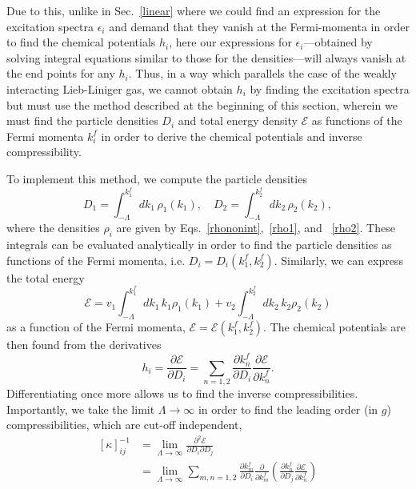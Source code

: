 \documentclass[aps,pra,
superscriptaddress,
reprint,twocolumn,preprintnumbers,
amsmath,amssymb,
nofootinbib]{revtex4-1}
\newcommand{\beq}{\begin{equation}}
\newcommand{\eeq}{\end{equation}}
\begin{document}
Due to this, unlike in Sec.~\ref{linear} where we could find an expression for the excitation spectra $\epsilon_i$ and demand that they vanish at the Fermi-momenta in order to find the chemical potentials $h_i$, here our expressions for $\epsilon_i$---obtained by solving integral equations similar to those for the densities---will always vanish at the end points for any $h_i$. Thus, in a way which parallels the case of the weakly interacting Lieb-Liniger gas, we cannot obtain $h_i$ by finding the excitation spectra but must use the method described at the beginning of this section, wherein we must find the particle densities $D_i$ and total energy density $\mathcal{E}$ as functions of the Fermi momenta $k_i^f$ in order to derive the chemical potentials and inverse compressibility. 


To implement this method, we compute  the particle densities 
\beq
\label{dens}
D_1 = \int_{-\Lambda}^{k_1^f} dk_1\, \rho_1(k_1),\quad D_2 = \int_{-\Lambda}^{k_2^f} dk_2\, \rho_2(k_2),
\eeq 
where the densities $\rho_i$ are given by Eqs.~\eqref{rhononint},~\eqref{rho1}, and ~\eqref{rho2}. These integrals can be evaluated analytically in order to find the particle densities as functions of the Fermi momenta, i.e. $D_i = D_i(k_1^f,k_2^f)$. Similarly, we can express the total energy
\beq
\label{energy}
\mathcal{E} = v_1 \int_{-\Lambda}^{k_1^f} dk_1 \,k_1 \rho_1(k_1) + v_2 \int_{-\Lambda}^{k_2^f} dk_2 \,k_2 \rho_2(k_2)
\eeq
as a function of the Fermi momenta, $\mathcal{E} = \mathcal{E}(k_1^f,k_2^f)$. The chemical potentials are then found from the derivatives
\begin{equation}
\label{eq:chempot}
h_i=\frac{\partial \mathcal{E}}{\partial D_i} = \sum_{n = 1,2} \frac{\partial k_n^f}{\partial D_i} \frac{\partial \mathcal{E}}{\partial k_n^f}.
\end{equation}
Differentiating once more allows us to find the inverse compressibilities. 
Importantly, we take the limit $\Lambda \to \infty$ in order to find the leading order (in $g$) compressibilities, which are cut-off independent,
\begin{align}
\label{eq:ccco}
\left[\kappa \right]^{-1}_{ij} &= \lim_{\Lambda \to \infty} \frac{\partial^2 \mathcal{E}}{\partial D_i \partial D_j} \nonumber \\
&= \lim_{\Lambda \to \infty} \sum_{m,n=1,2} \frac{\partial k_m^f}{\partial D_i} \frac{\partial}{\partial k_m^f} \left( \frac{\partial k_n^f}{\partial D_j} \frac{\partial \mathcal{E}}{\partial k_n^f} \right)
\end{align}
\end{document}
